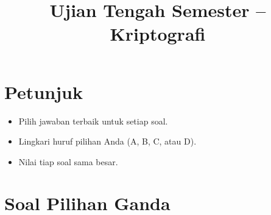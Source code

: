 \documentclass[12pt]{article}
\title{Ujian Tengah Semester – Kriptografi}
\date{}
\begin{document}
\maketitle

\section*{Petunjuk}
\begin{itemize}
    \item Pilih jawaban terbaik untuk setiap soal.
    \item Lingkari huruf pilihan Anda (A, B, C, atau D).
    \item Nilai tiap soal sama besar.
\end{itemize}

\section*{Soal Pilihan Ganda}
\end{document}

